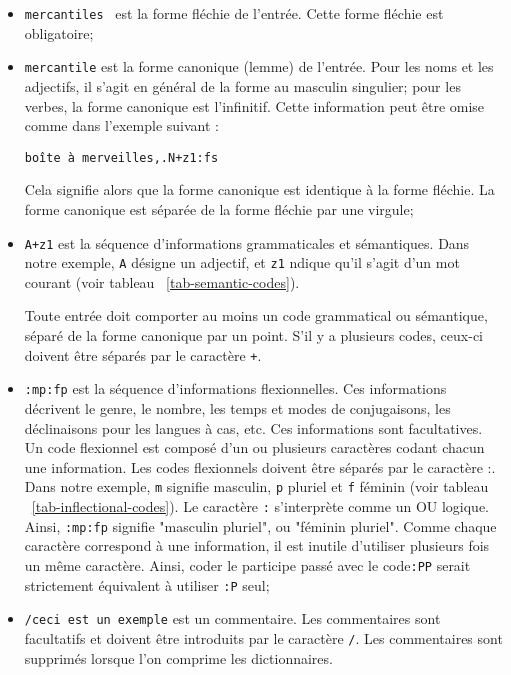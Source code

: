 \bigskip
\begin{itemize}
\item \verb+mercantiles + est la forme fléchie de l’entrée. Cette forme fléchie
est obligatoire;
  
\bigskip \item \verb+mercantile+ est la forme canonique (lemme) de l’entrée.
 Pour les noms et les adjectifs, il s’agit
en général de la forme au masculin singulier; pour les verbes, la forme canonique est
l’infinitif. Cette information peut être omise comme dans l’exemple suivant :

  
\bigskip
\verb$boîte à merveilles,.N+z1:fs$
  
\bigskip Cela signifie alors que la forme canonique est identique à la forme fléchie. La forme
canonique est séparée de la forme fléchie par une virgule;
\index{\verbc{,}}
  
\bigskip \item \verb$A+z1$ est la séquence d’informations grammaticales et sémantiques.
 Dans notre exemple, \verb+A+
désigne un adjectif, et \verb+z1+ ndique qu’il s’agit d’un mot courant (voir tableau ~\ref{tab-semantic-codes}).

Toute entrée doit comporter au moins un code grammatical ou sémantique, séparé de
la forme canonique par un point. S’il y a plusieurs codes, ceux-ci doivent être séparés
par le caractère \verb$+$\index{\verbc{+}}.
  
\bigskip
\item \verb+:mp:fp+ est la séquence d’informations flexionnelles.
 Ces informations décrivent le genre, le nombre, les temps et modes
de conjugaisons, les déclinaisons pour les langues à cas, etc. Ces informations sont facultatives.
Un code flexionnel est composé d’un ou plusieurs caractères codant chacun une information. Les codes
flexionnels doivent être séparés par le caractère :. Dans notre exemple, \verb+m+ signifie masculin,
\verb+p+ pluriel et \verb+f+ féminin (voir tableau ~\ref{tab-inflectional-codes}). Le caractère \verb+:+ s’interprète comme un OU logique. Ainsi, \verb+:mp:fp+ signifie "masculin pluriel", ou "féminin pluriel". Comme chaque caractère correspond à une information, il est inutile d’utiliser plusieurs fois un même caractère. Ainsi, coder le participe passé avec le code\verb+:PP+ serait strictement équivalent à utiliser \verb+:P+ seul;\index{\verbc{:}}
  
\bigskip \item \verb+/ceci est un exemple+ est un commentaire. Les commentaires sont facultatifs et
doivent être introduits par le caractère \verb+/+. Les commentaires sont supprimés lorsque
l’on comprime les dictionnaires.  \index{\verbc{/}}
\end{itemize}

